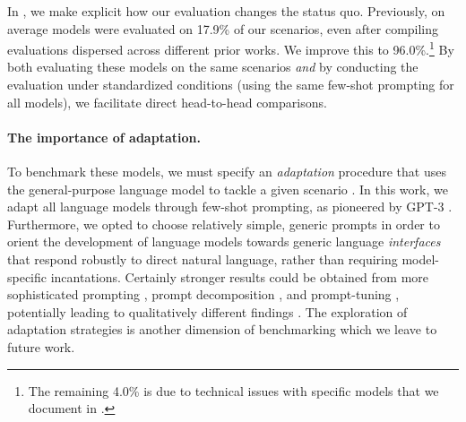 In , we make explicit how our evaluation changes the status quo.
Previously, on average models were evaluated on 17.9\% of our \core scenarios, even after compiling evaluations dispersed across different prior works.
We improve this to 96.0\%.\footnote{The remaining 4.0\% is due to technical issues with specific models that we document in .}
By both evaluating these models on the same scenarios \emph{and} by conducting the evaluation under standardized conditions (\eg using the same few-shot prompting for all models), we facilitate direct head-to-head comparisons.

\paragraph{The importance of adaptation.}
To benchmark these models, we must specify an \textit{adaptation} procedure that uses the general-purpose language model to tackle a given scenario \citep[see][\S4.3]{bommasani2021opportunities}.
In this work, we adapt all language models through few-shot prompting, as pioneered by GPT-3 \citep{brown2020gpt3}.
Furthermore, we opted to choose relatively simple, generic prompts in order to orient the development of language models towards generic language \emph{interfaces}
that respond robustly to direct natural language,
rather than requiring model-specific incantations.
Certainly stronger results could be obtained from
more sophisticated prompting \citep[\eg chain-of-thoughts;][]{wei2022chain},
prompt decomposition \citep{wu2022aichains, press2022selfask, arora2022ama}, 
and prompt-tuning \citep{lester2021power,li2021prefix},
potentially leading to qualitatively different findings \citep{suzgun2022challenging}.
The exploration of adaptation strategies is another dimension of benchmarking which we leave to future work.

